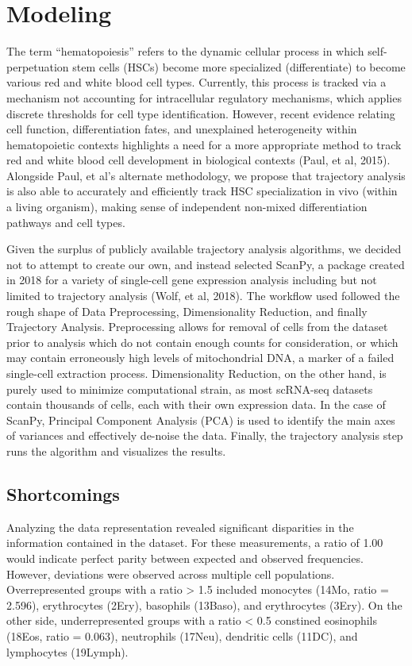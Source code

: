 \documentclass{article}
\begin{document}
\section{Modeling}
The term “hematopoiesis” refers to the dynamic cellular process in which self-perpetuation stem cells (HSCs) become more specialized (differentiate) to become various red and white blood cell types. Currently, this process is tracked via a mechanism not accounting for intracellular regulatory mechanisms, which applies discrete thresholds for cell type identification. However, recent evidence relating cell function, differentiation fates, and unexplained heterogeneity within hematopoietic contexts highlights a need for a more appropriate method to track red and white blood cell development in biological contexts (Paul, et al, 2015). Alongside Paul, et al’s alternate methodology, we propose that trajectory analysis is also able to accurately and efficiently track HSC specialization in vivo (within a living organism), making sense of independent non-mixed differentiation pathways and cell types. 

Given the surplus of publicly available trajectory analysis algorithms, we decided not to attempt to create our own, and instead selected ScanPy, a package created in 2018 for a variety of single-cell gene expression analysis including but not limited to trajectory analysis (Wolf, et al, 2018). The workflow used followed the rough shape of Data Preprocessing, Dimensionality Reduction, and finally Trajectory Analysis. Preprocessing allows for removal of cells from the dataset prior to analysis which do not contain enough counts for consideration, or which may contain erroneously high levels of mitochondrial DNA, a marker of a failed single-cell extraction process. Dimensionality Reduction, on the other hand, is purely used to minimize computational strain, as most scRNA-seq datasets contain thousands of cells, each with their own expression data. In the case of ScanPy, Principal Component Analysis (PCA) is used to identify the main axes of variances and effectively de-noise the data. Finally, the trajectory analysis step runs the algorithm and visualizes the results. 

\subsection{Shortcomings}
Analyzing the data representation revealed significant disparities in the information contained in the dataset. For these measurements, a ratio of 1.00 would indicate perfect parity between expected and observed frequencies. However, deviations were observed across multiple cell populations. Overrepresented groups with a ratio > 1.5 included monocytes (14Mo, ratio = 2.596), erythrocytes (2Ery), basophils (13Baso), and erythrocytes (3Ery). On the other side, underrepresented groups with a ratio < 0.5 constined eosinophils (18Eos, ratio = 0.063), neutrophils (17Neu), dendritic cells (11DC), and lymphocytes (19Lymph).
\end{document}
